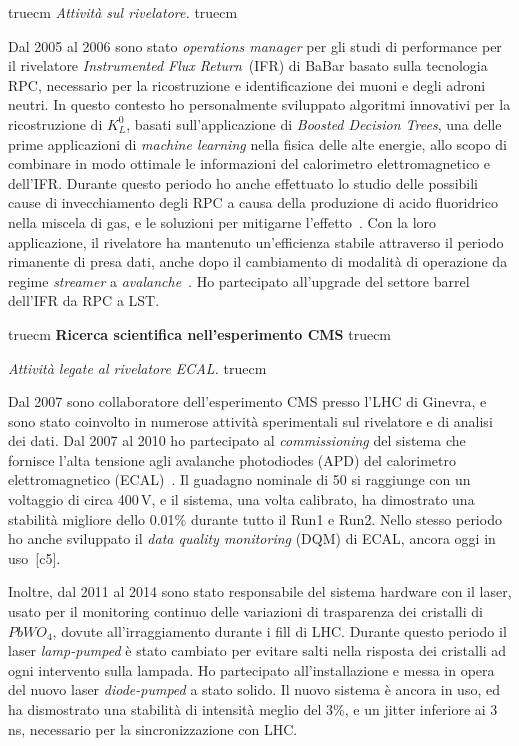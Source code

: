 \documentclass[11pt,twoside,a4paper]{article}
\begin{document}
 truecm
\textit{Attivit\`a sul rivelatore.}
 truecm

Dal 2005 al 2006 sono stato \textit{operations manager} per gli studi
di performance per il rivelatore \textit{Instrumented Flux
  Return}~(IFR) di BaBar basato sulla tecnologia RPC, necessario per
la ricostruzione e identificazione dei muoni e degli adroni neutri. In
questo contesto ho personalmente sviluppato algoritmi innovativi per
la ricostruzione di $K^0_L$, basati sull'applicazione di
\textit{Boosted Decision Trees}, una delle prime applicazioni di
\textit{machine learning} nella fisica delle alte energie, allo scopo
di combinare in modo ottimale le informazioni del calorimetro
elettromagnetico e dell'IFR. Durante questo periodo ho anche
effettuato lo studio delle possibili cause di invecchiamento degli RPC
a causa della produzione di acido fluoridrico nella miscela di gas, e
le soluzioni per mitigarne l'effetto~\cite{Band:2008zza}. Con la loro
applicazione, il rivelatore ha mantenuto un'efficienza stabile
attraverso il periodo rimanente di presa dati, anche dopo il
cambiamento di modalit\`a di operazione da regime \textit{streamer} a
\textit{avalanche}~\cite{Band:2006ig,Anulli:2005wi}. Ho partecipato
all'upgrade del settore barrel dell'IFR da RPC a LST.

\clearpage

 truecm
{\bf{Ricerca scientifica nell'esperimento CMS}}
 truecm

\textit{Attivit\`a legate al rivelatore ECAL.}
 truecm

Dal 2007 sono collaboratore dell'esperimento CMS presso l'LHC di
Ginevra, e sono stato coinvolto in numerose attivit\`a sperimentali
sul rivelatore e di analisi dei dati. Dal 2007 al 2010 ho partecipato
al \textit{commissioning} del sistema che fornisce l'alta tensione
agli avalanche photodiodes (APD) del calorimetro elettromagnetico
(ECAL)~\cite{Bartoloni_2013}. Il guadagno nominale di 50 si raggiunge
con un voltaggio di circa 400\,V, e il sistema, una volta calibrato,
ha dimostrato una stabilit\`a migliore dello 0.01\% durante tutto il
Run1 e Run2.  Nello stesso periodo ho anche sviluppato il \textit{data
  quality monitoring} (DQM) di ECAL, ancora oggi in
uso~\cite{DiMarco:2009zz}[c5].

Inoltre, dal 2011 al 2014 sono stato responsabile del sistema hardware
con il laser, usato per il monitoring continuo delle variazioni di
trasparenza dei cristalli di $PbWO_4$, dovute all'irraggiamento
durante i fill di LHC. Durante questo periodo il laser
\textit{lamp-pumped} \`e stato cambiato per evitare salti nella
risposta dei cristalli ad ogni intervento sulla lampada. Ho
partecipato all'installazione e messa in opera del nuovo laser
\textit{diode-pumped} a stato solido. Il nuovo sistema \`e ancora in
uso, ed ha dismostrato una stabilit\`a di intensit\`a meglio del 3\%,
e un jitter inferiore ai 3\,ns, necessario per la sincronizzazione con
LHC.
\end{document}
